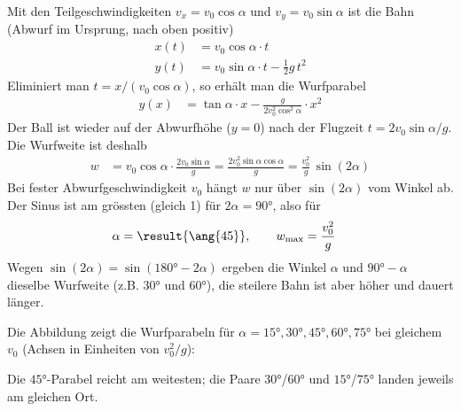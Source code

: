 Mit den Teilgeschwindigkeiten $v_x = v_0\cos\alpha$ und $v_y = v_0\sin\alpha$ ist die Bahn (Abwurf im Ursprung, nach oben positiv)
\begin{align}
 x(t) &= v_0\cos\alpha\cdot t \\
 y(t) &= v_0\sin\alpha\cdot t - \frac{1}{2}g\,t^2
\end{align}
Eliminiert man $t = x/(v_0\cos\alpha)$, so erhält man die Wurfparabel
\begin{align}
 y(x) &= \tan\alpha\cdot x - \frac{g}{2v_0^2\cos^2\alpha}\cdot x^2
\end{align}
Der Ball ist wieder auf der Abwurfhöhe ($y = 0$) nach der Flugzeit $t = 2v_0\sin\alpha/g$. Die Wurfweite ist deshalb
\begin{align}
 w &= v_0\cos\alpha\cdot\frac{2v_0\sin\alpha}{g} = \frac{2v_0^2\sin\alpha\cos\alpha}{g} = \frac{v_0^2}{g}\,\sin(2\alpha)
\end{align}
Bei fester Abwurfgeschwindigkeit $v_0$ hängt $w$ nur über $\sin(2\alpha)$ vom Winkel ab. Der Sinus ist am grössten (gleich 1) für $2\alpha = \ang{90}$, also für
\begin{align}
 \alpha &= \result{\ang{45}}, \qquad w_\text{max} = \frac{v_0^2}{g}
\end{align}
Wegen $\sin(2\alpha) = \sin(\ang{180}-2\alpha)$ ergeben die Winkel $\alpha$ und $\ang{90}-\alpha$ dieselbe Wurfweite (z.B. $\ang{30}$ und $\ang{60}$), die steilere Bahn ist aber höher und dauert länger.

Die Abbildung zeigt die Wurfparabeln für $\alpha = \ang{15}, \ang{30}, \ang{45}, \ang{60}, \ang{75}$ bei gleichem $v_0$ (Achsen in Einheiten von $v_0^2/g$):
\begin{center}
\end{center}
Die $\ang{45}$-Parabel reicht am weitesten; die Paare $\ang{30}$/$\ang{60}$ und $\ang{15}$/$\ang{75}$ landen jeweils am gleichen Ort.
